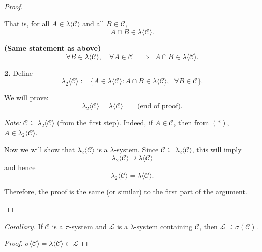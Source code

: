 \documentclass[11pt]{article}
\theoremstyle{definition}
\begin{document}
\begin{proof}
\begin{enumerate}
        That is, for all $A \in \lambda\langle \mathcal{C}\rangle$ and all $B \in \mathcal{C}$,
        \[
        A \cap B \in \lambda\langle \mathcal{C}\rangle.
        \]


        \noindent
        \textbf{(Same statement as above)}  
        \[
        \forall B \in \lambda\langle \mathcal{C}\rangle, \quad \forall A \in \mathcal{C} \;\;\implies\;\; A \cap B \in \lambda\langle \mathcal{C}\rangle.
        \]
        
        \bigskip
        
        \textbf{2.} Define
        \[
         \lambda_2\langle \mathcal{C}\rangle := \{ A \in \lambda\langle \mathcal{C}\rangle : A \cap B \in \lambda\langle \mathcal{C}\rangle, \;\; \forall B \in \mathcal{C}\}.
        \]
        
        We will prove:
        \[
         \lambda_2\langle \mathcal{C}\rangle = \lambda\langle \mathcal{C}\rangle \qquad \text{(end of proof).}
        \]
        
        \medskip
        
        \textit{Note:} $\mathcal{C} \subseteq  \lambda_2\langle \mathcal{C}\rangle$ (from the first step).  
        Indeed, if $A \in \mathcal{C}$, then from \((*)\), $A \in  \lambda_2\langle \mathcal{C}\rangle$.
        
        \medskip
        
        Now we will show that $ \lambda_2\langle \mathcal{C}\rangle$ is a $\lambda$-system.  
        Since $\mathcal{C} \subseteq  \lambda_2\langle \mathcal{C}\rangle$, this will imply
        \[
         \lambda_2\langle \mathcal{C}\rangle \supseteq \lambda\langle \mathcal{C}\rangle
        \]
        and hence
        \[
         \lambda_2\langle \mathcal{C}\rangle = \lambda\langle \mathcal{C}\rangle.
        \]
        
        \medskip
        
        Therefore, the proof is the same (or similar) to the first part of the argument. 
    \end{enumerate}
\end{proof}

    \emph{Corollary.}
    If $\mathcal{C}$ is a $\pi$-system and $\mathcal{L}$ is a $\lambda$-system containing $\mathcal{C}$, then $\mathcal{L} \supseteq \sigma(\mathcal{C})$.
    \begin{proof}
        $\sigma\langle\mathcal{C}\rangle = \lambda\langle \mathcal{C}\rangle \subset \mathcal{L}$
    \end{proof}
\end{document}
